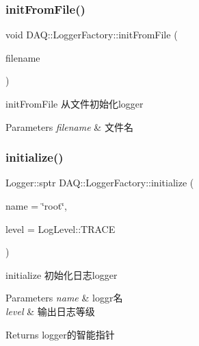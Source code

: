 \subsubsection{\texorpdfstring{init\+From\+File()}{initFromFile()}}
{\footnotesize\ttfamily void D\+A\+Q\+::\+Logger\+Factory\+::init\+From\+File (\begin{DoxyParamCaption}\item[{const std\+::string \&}]{filename }\end{DoxyParamCaption})}



init\+From\+File 从文件初始化logger 


\begin{DoxyParams}{Parameters}
{\em filename} & 文件名 \\
\hline
\end{DoxyParams}
\mbox{\label{classDAQ_1_1LoggerFactory_a2504db6f7e1b8f5e8b1cbfa26cff81c5}} 
\subsubsection{\texorpdfstring{initialize()}{initialize()}}
{\footnotesize\ttfamily Logger\+::sptr D\+A\+Q\+::\+Logger\+Factory\+::initialize (\begin{DoxyParamCaption}\item[{const std\+::string \&}]{name = {\ttfamily \char`\"{}root\char`\"{}},  }\item[{const Log\+Level}]{level = {\ttfamily LogLevel\+:\+:TRACE} }\end{DoxyParamCaption})}



initialize 初始化日志logger 


\begin{DoxyParams}{Parameters}
{\em name} & loggr名 \\
\hline
{\em level} & 输出日志等级\\
\hline
\end{DoxyParams}
\begin{DoxyReturn}{Returns}
logger的智能指针 
\end{DoxyReturn}
\mbox{\label{classDAQ_1_1LoggerFactory_a02b883181a962128f9ba0bc53932e5f4}} 
